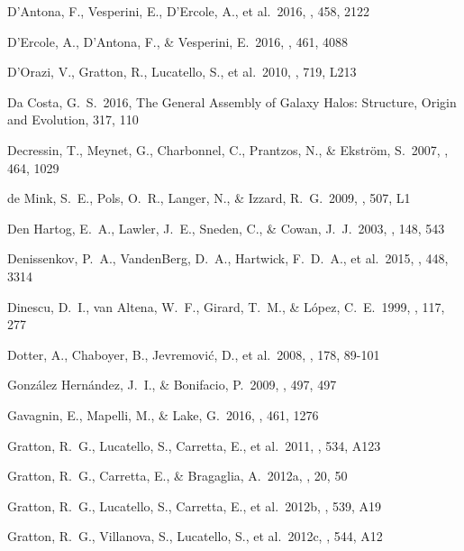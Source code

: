 \documentclass[12pt,preprint]{emulateapj}
\begin{document}
\begin{thebibliography}{}
 D'Antona, F., Vesperini, E., D'Ercole, A., et al.\ 2016, \mnras, 458, 2122

 D'Ercole, A., D'Antona, F., \& Vesperini, E.\ 2016, \mnras, 461, 4088

 D'Orazi, V., Gratton, R., Lucatello, S., et al.\ 2010, \apjl, 719, L213

 Da Costa, G.~S.\ 2016, The General Assembly of Galaxy Halos: Structure, Origin and Evolution, 317, 110

 Decressin, T., Meynet, G., Charbonnel, C., Prantzos, N., \& Ekstr{\"o}m, S.\ 2007, \aap, 464, 1029

 de Mink, S.~E., Pols, O.~R., Langer, N., \& Izzard, R.~G.\ 2009, \aap, 507, L1

 Den Hartog, E.~A., Lawler, J.~E., Sneden, C., \& Cowan, J.~J.\ 2003, \apjs, 148, 543

 Denissenkov, P.~A., VandenBerg, D.~A., Hartwick, F.~D.~A., et al.\ 2015, \mnras, 448, 3314

 Dinescu, D.~I., van Altena, W.~F., Girard, T.~M., \& L{\'o}pez, C.~E.\ 1999, \aj, 117, 277

 Dotter, A., Chaboyer, B., Jevremovi{\'c}, D., et al.\ 2008, \apjs, 178, 89-101

 Gonz{\'a}lez Hern{\'a}ndez, J.~I., \& Bonifacio, P.\ 2009, \aap, 497, 497

 Gavagnin, E., Mapelli, M., \& Lake, G.\ 2016, \mnras, 461, 1276

 Gratton, R.~G., Lucatello, S., Carretta, E., et al.\ 2011, \aap, 534, A123 

 Gratton, R.~G., Carretta, E., \& Bragaglia, A.\ 2012a, \aapr, 20, 50

 Gratton, R.~G., Lucatello, S., Carretta, E., et al.\ 2012b, \aap, 539, A19

 Gratton, R.~G., Villanova, S., Lucatello, S., et al.\ 2012c, \aap, 544, A12


\end{thebibliography}
\end{document}
